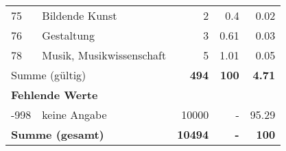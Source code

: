 \begin{longtable}{lXrrr}
        75 & \multicolumn{1}{X}{Bildende Kunst} & %
          \num{2} &
          \num[round-mode=places,round-precision=2]{0,4} &
          \num[round-mode=places,round-precision=2]{0,02} \\

        76 & \multicolumn{1}{X}{Gestaltung} & %
          \num{3} &
          \num[round-mode=places,round-precision=2]{0,61} &
          \num[round-mode=places,round-precision=2]{0,03} \\

        78 & \multicolumn{1}{X}{Musik, Musikwissenschaft} & %
          \num{5} &
          \num[round-mode=places,round-precision=2]{1,01} &
          \num[round-mode=places,round-precision=2]{0,05} \\

     \midrule
     \multicolumn{2}{l}{Summe (gültig)} &
       \textbf{\num{494}} &
     \textbf{100} &
       \textbf{\num[round-mode=places,round-precision=2]{4,71}} \\
     \multicolumn{5}{l}{\textbf{Fehlende Werte}}\\
       -998 &
       keine Angabe &
         \num{10000} &
        - &
         \num[round-mode=places,round-precision=2]{95,29} \\
     \midrule
     \multicolumn{2}{l}{\textbf{Summe (gesamt)}} &
          \textbf{\num{10494}} &
        \textbf{-} &
        \textbf{100} \\
     \bottomrule
     \end{longtable}
     
